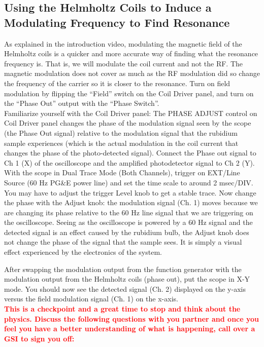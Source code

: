 \documentclass{../lab}
\begin{document}
\subsection{Using the Helmholtz Coils to Induce a Modulating Frequency to Find Resonance}

As explained in the introduction video, modulating the magnetic field of the Helmholtz coils is a quicker and more accurate way of finding what the resonance frequency is. That is, we will modulate the coil current and not the RF. The magnetic modulation does not cover as much as the RF modulation did so change the frequency of the carrier so it is closer to the resonance. Turn on field modulation by flipping the ``Field'' switch on the Coil Driver panel, and turn on the ``Phase Out'' output with the ``Phase Switch''. \\

Familiarize yourself with the Coil Driver panel: The PHASE ADJUST control on Coil Driver panel changes the phase of the modulation signal seen by the scope (the Phase Out signal) relative to the modulation signal that the rubidium sample experiences (which is the actual modulation in the coil current that changes the phase of the photo-detected signal). Connect the Phase out signal to Ch 1 (X) of the oscilloscope and the amplified photodetector signal to Ch 2 (Y). With the scope in Dual Trace Mode (Both Channels), trigger on EXT/Line Source (60 Hz PG\&E power line) and set the time scale to around 2 msec/DIV. You may have to adjust the trigger Level knob to get a stable trace. Now change the phase with the Adjust knob: the modulation signal (Ch. 1) moves because we are changing its phase relative to the 60 Hz line signal that we are triggering on the oscilloscope. Seeing as the oscilloscope is powered by a 60 Hz signal and the detected signal is an effect caused by the rubidium bulb, the Adjust knob does not change the phase of the signal that the sample sees. It is simply a visual effect experienced by the electronics of the system. 

\newpage

After swapping the modulation output from the function generator with the modulation output from the Helmholtz coils (phase out), put the scope in X-Y mode. You should now see the detected signal (Ch. 2) displayed on the y-axis versus the field modulation signal (Ch. 1) on the x-axis. \\

\noindent\textbf{\textcolor{red}{This is a checkpoint and a great time to stop and think about the physics. Discuss the following questions with you partner and once you feel you have a better understanding of what is happening, call over a GSI to sign you off:}}
\end{document}

